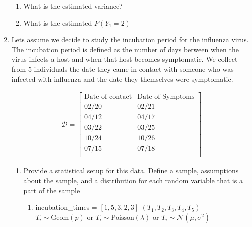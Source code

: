 \documentclass[krantz1,ChapterTOCs]{krantz}
\begin{document}
\begin{enumerate}
\begin{enumerate}
        \item What is the estimated variance? 
        \begin{enumerate}
            \item {\color{red} $\hat{V(X)} = \hat{\sigma^{2}} = 1.12$ 
        \end{enumerate}
        
        \item What is the estimated $P(Y_{1} = 2)$
        \begin{enumerate}
            \item {\color{red} $P(Y=2) = 0$ 
        \end{enumerate}
        
    \end{enumerate}
    \item Lets assume we decide to study the incubation period for the influenza virus. The incubation period is defined as the number of days between when the virus infects a host and when that host becomes symptomatic. We collect from 5 individuals the date they came in contact with someone who was infected with influenza and the date they themselves were symptomatic.
    
    \begin{align}
        \mathcal{D} 
        = \begin{bmatrix}
            \text{Date of contact} & \text{Date of Symptoms}\\
            02/20  & 02/21\\
            04/12  & 04/17\\
            03/22  & 03/25\\
            10/24  & 10/26\\
            07/15  & 07/18\\
          \end{bmatrix}
    \end{align}
    
    \begin{enumerate}
        \item Provide a statistical setup for this data. Define a sample, assumptions about the sample, and a distribution for each random variable that is a part of the sample
        
        \begin{enumerate}
            \item {
            \color{red} 
            incubation\_times = $[1,5,3,2,3]$
            $(T_{1},T_{2},T_{3},T_{4},T_{5})$
            $T_{i} \sim \text{Geom}(p)$ or 
            $T_{i} \sim \text{Poisson}(\lambda)$ or 
            $T_{i} \sim \mathcal{N}(\mu,\sigma^{2})$ 
            } 
        \end{enumerate}
        

\end{enumerate}
\end{enumerate}
\end{document}
